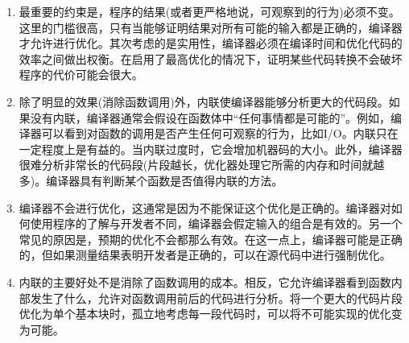 \begin{enumerate}
\item 
最重要的约束是，程序的结果(或者更严格地说，可观察到的行为)必须不变。这里的门槛很高，只有当能够证明结果对所有可能的输入都是正确的，编译器才允许进行优化。其次考虑的是实用性，编译器必须在编译时间和优化代码的效率之间做出权衡。在启用了最高优化的情况下，证明某些代码转换不会破坏程序的代价可能会很大。 

\item 
除了明显的效果(消除函数调用)外，内联使编译器能够分析更大的代码段。如果没有内联，编译器通常会假设在函数体中“任何事情都是可能的”。例如，编译器可以看到对函数的调用是否产生任何可观察的行为，比如I/O。内联只在一定程度上是有益的。当内联过度时，它会增加机器码的大小。此外，编译器很难分析非常长的代码段(片段越长，优化器处理它所需的内存和时间就越多)。编译器具有判断某个函数是否值得内联的方法。

\item 
编译器不会进行优化，这通常是因为不能保证这个优化是正确的。编译器对如何使用程序的了解与开发者不同，编译器会假定输入的组合是有效的。另一个常见的原因是，预期的优化不会都那么有效。在这一点上，编译器可能是正确的，但如果测量结果表明开发者是正确的，可以在源代码中进行强制优化。

\item
内联的主要好处不是消除了函数调用的成本。相反，它允许编译器看到函数内部发生了什么，允许对函数调用前后的代码进行分析。将一个更大的代码片段优化为单个基本块时，孤立地考虑每一段代码时，可以将不可能实现的优化变为可能。

\end{enumerate}